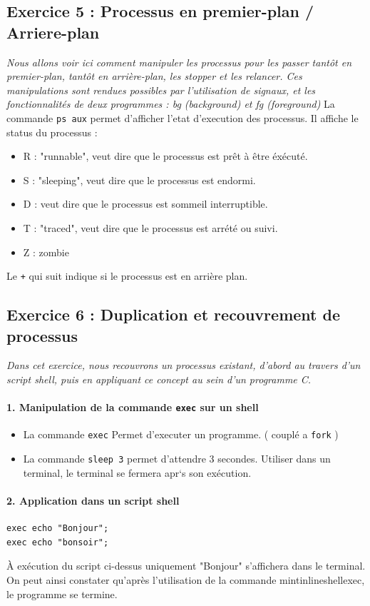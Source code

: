 \subsection{Exercice 5 : Processus en premier-plan / Arriere-plan}
\textit{Nous allons voir ici comment manipuler les processus pour les passer tantôt en premier-plan, tantôt en arrière-plan, les stopper et les relancer. Ces manipulations sont rendues possibles par l’utilisation de signaux, et les fonctionnalités de deux programmes : bg (background) et fg (foreground)}
La commande \texttt{ps aux} permet d'afficher l'etat d'execution des processus.
Il affiche le status du processus :
\begin{itemize}
\item R : "runnable", veut dire que le processus est prêt à être éxécuté.
\item S : "sleeping", veut dire que le processus est endormi.
\item D : veut dire que le processus est sommeil interruptible.
\item T : "traced", veut dire que le processus est arrété ou suivi.
\item Z : zombie
\end{itemize}
Le \texttt{+} qui suit indique si le processus est en arrière plan.

\subsection{Exercice 6 : Duplication et recouvrement de processus}
\textit{Dans cet exercice, nous recouvrons un processus existant, d’abord au travers d’un script shell, puis en appliquant ce concept au sein d’un programme C.}
\paragraph{1. Manipulation de la commande \texttt{exec} sur un shell}
\begin{itemize}
  \item La commande \texttt{exec} Permet d'executer un programme. ( couplé a \texttt{fork} )
  \item La commande \texttt{sleep 3} permet d'attendre 3 secondes.
  Utiliser dans un terminal, le terminal se fermera apr`s son exécution.
\end{itemize}

\paragraph{2. Application dans un script shell}
\begin{verbatim}
exec echo "Bonjour";
exec echo "bonsoir";
\end{verbatim}
À exécution du script ci-dessus uniquement "Bonjour" s'affichera dans le terminal. On peut ainsi constater qu'après l'utilisation de la commande mintinline{shell}{exec}, le programme se termine.

